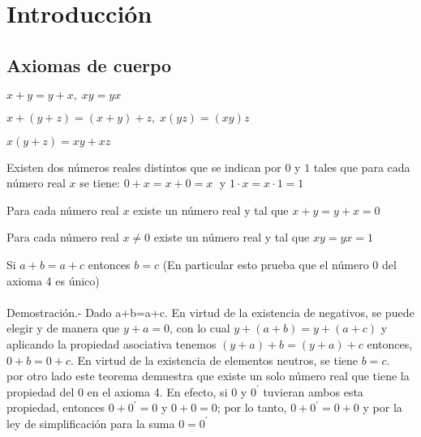 \chapter*{Introducción}
\setcounter{chapter}{3}
\setcounter{section}{1}
\section{Axiomas de cuerpo}
\begin{tcolorbox}[colback=white]
\begin{axioma} $x+y=y+x, \; xy=yx$\\
\end{axioma}

\begin{axioma} $x+(y+z)=(x+y)+z, \; x(yz)=(xy)z$ \\
\end{axioma}

\begin{axioma} $x(y+z)=xy+xz$ \\
\end{axioma}

\begin{axioma} Existen dos números reales distintos que se indican por $0$ y $1$ tales que para cada número real $x$ se tiene:
$0+x=x+0=x \;$ y $1\cdot x = x\cdot 1 = 1$ \\
\end{axioma}

\begin{axioma} Para cada número real $x$ existe un número real y tal que $x+y=y+x=0$ \\
\end{axioma}

\begin{axioma} Para cada número real $x\neq 0$ existe un número real y tal que $xy=yx=1$ \\
\end{axioma}
\end{tcolorbox}

\begin{teo}
Si $a+b=a+c$ entonces $b=c$ (En particular esto prueba que el número 0 del axioma 4 es único)\\\\
Demostración.- \;
Dado a+b=a+c. En virtud de la existencia de negativos, se puede elegir y de manera que $y+a=0$, con lo cual $y+(a+b)=y+(a+c)$ y aplicando la propiedad asociativa tenemos $(y+a)+b=(y+a)+c$ entonces, $0+b=0+c$. En virtud de la existencia de elementos neutros, se tiene $b=c$.\\
por otro lado este teorema demuestra que existe un solo número real que tiene la propiedad del 0 en el axioma 4. En efecto, si $0$ y $0^{'}$ tuvieran ambos esta propiedad, entonces $0+0^{'}=0$ y $0+0=0$; por lo tanto, $0+0^{'}=0+0$ y por la ley de simplificación para la suma $0=0^{'}$\\\\
\end{teo}

